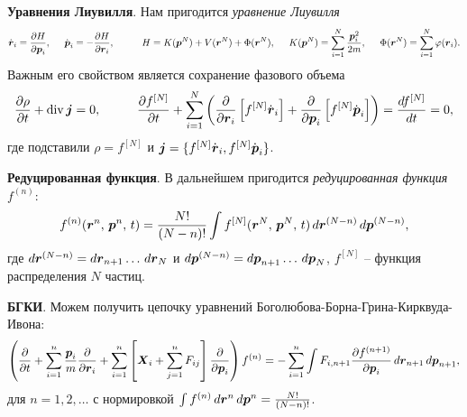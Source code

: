 \textbf{Уравнения Лиувилля}.
Нам пригодится \textit{уравнение Лиувилля}
\begin{equation*}
	\dot{\vc{r}}_i = \frac{\partial H}{\partial \vc{p}_i},
	\hspace{5 mm} 
	\dot{\vc{p}}_i = -\frac{\partial H}{\partial \vc{r}_i},
	\hspace{10 mm} 
	H = K(\vc{p}^N) + V(\vc{r}^N) + \Phi (\vc{r}^N),
	\hspace{5 mm} 
	K(\vc{p}^N) = \sum_{i=1}^{N} \frac{\vc{p}_i^2}{2m},
	\hspace{5 mm} 
	\Phi (\vc{r}^N) = \sum_{i=1}^{N} \varphi (\vc{r}_i).
\end{equation*}
Важным его свойством является сохранение фазового объема
\begin{equation*}
\frac{\partial \rho}{\partial t} + \div \vc{j} = 0,
\hspace{10 mm} 
	\frac{\partial f^{[N]}}{\partial t} + \sum_{i=1}^{N}\left( \frac{\partial }{\partial \vc{r}_i} \left[f^{[N]} \dot{\vc{r}}_i\right] + \frac{\partial }{\partial \vc{p}_i} \left[
				f^{[N]} \dot{\vc{p}}_i
			\right]\right) = \frac{d f^{[N]}}{d t} = 0, 
\end{equation*}
где подставили $\rho = f^{[N]}$ и $\boldsymbol{j} = \{f^{[N]} \dot{\boldsymbol{r}}_i, f^{[N]} \dot{\boldsymbol{p}}_i\}$.


\textbf{Редуцированная функция}. 
В дальнейшем пригодится \textit{редуцированная функция} $f^{(n)}$:
\begin{equation*}
	f^{(n)} (\boldsymbol{r}^n,\, \boldsymbol{p}^n,\, t) = \frac{N!}{(N-n)!} \int f^{[N]} (\boldsymbol{r}^N,\, \boldsymbol{p}^N,\, t) \, d \boldsymbol{r}^{(N-n)} \, d \boldsymbol{p}^{(N-n)},
\end{equation*}
где $d \boldsymbol{r}^{(N-n)} = d \boldsymbol{r}_{n+1} \ldots \, d \boldsymbol{r}_N$ и $d \boldsymbol{p}^{(N-n)} = d \boldsymbol{p}_{n+1} \ldots \, d \boldsymbol{p}_N$,  $f^{[N]}$ -- функция распределения $N$ частиц. 

\textbf{БГКИ}. Можем получить цепочку уравнений Боголюбова-Борна-Грина-Кирквуда-Ивона:
\begin{equation}
	\left(
		\frac{\partial }{\partial t} + \sum_{i=1}^{n} \frac{\boldsymbol{p}_i}{m} \frac{\partial }{\partial \boldsymbol{r}_i} + \sum_{i=1}^{n} \left[
			\boldsymbol{X}_i + \sum_{j=1}^{n} F_{ij}
		\right] \frac{\partial }{\partial \boldsymbol{p}_i} 
	\right) f^{(n)} = - \sum_{i=1}^{n} \int F_{i, n+1} \frac{\partial f^{(n+1)}}{\partial \boldsymbol{p}_i} \, d \boldsymbol{r}_{n+1} \, d \boldsymbol{p}_{n+1},
\end{equation}
для $n=1,2,\ldots$ с нормировкой  $\int f^{(n)} \, d \boldsymbol{r}^{n} \, d \boldsymbol{p}^n = \frac{N!}{(N-n)!}$.

